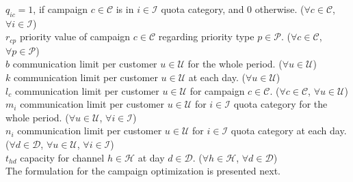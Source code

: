 \documentclass[11pt]{article}
\begin{document}
\noindent $q_{{i}{c}}=1$, if campaign $c \in \mathcal{C}$ is in $i \in \mathcal{I}$ quota category, and 0 otherwise.
($\forall c \in \mathcal{C}$, $\forall i \in \mathcal{I}$)\\

\noindent $r_{{c}{p}}$ priority value of campaign $c \in \mathcal{C}$ regarding priority type $p \in \mathcal{P}$.
($\forall c \in \mathcal{C}$, $\forall p \in \mathcal{P}$)\\

\noindent $b$ communication limit per customer $u \in \mathcal{U}$ for the whole period.
($\forall u \in \mathcal{U}$)\\

\noindent $k$ communication limit per customer $u \in \mathcal{U}$ at each day.
($\forall u \in \mathcal{U}$)\\

\noindent $l_{c}$ communication limit per customer $u \in \mathcal{U}$ for campaign $c \in \mathcal{C}$.
($\forall c \in \mathcal{C}$, $\forall u \in \mathcal{U}$)\\

\noindent $m_{i}$ communication limit per customer $u \in \mathcal{U}$ for $i \in \mathcal{I}$ quota category for the whole period.
($\forall u \in \mathcal{U}$, $\forall i \in \mathcal{I}$)\\

\noindent $n_{i}$ communication limit per customer $u \in \mathcal{U}$ for $i \in \mathcal{I}$ quota category at each day.
($\forall d \in \mathcal{D}$, $\forall u \in \mathcal{U}$, $\forall i \in \mathcal{I}$)\\

\noindent $t_{{h}{d}}$ capacity for channel $h \in \mathcal{H}$ at day $d \in \mathcal{D}$.
($\forall h \in \mathcal{H}$, $\forall d \in \mathcal{D}$)\\

\noindent The formulation for the campaign optimization is presented next.
\end{document}
